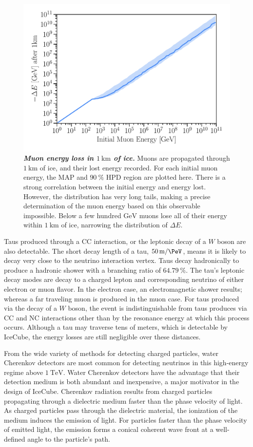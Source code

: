 \begin{figure}
	\centering
	\includegraphics[width=0.8\linewidth]{figures/muon_energy}
	\caption{\textbf{\textit{Muon energy loss in $\SI{1}\km$ of ice.}}
		Muons are propagated through $\SI{1}\km$ of ice, and their lost energy recorded.
		For each initial muon energy, the MAP and $\SI{90}\percent$ HPD region are plotted here.
		There is a strong correlation between the initial energy and energy lost.
		However, the distribution has very long tails, making a precise determination of the muon energy based on this observable impossible.
		Below a few hundred $\si\GeV$ muons lose all of their energy within $\SI{1}\km$ of ice, narrowing the distribution of $\Delta E$.
	}\label{fig:muon_energy}
\end{figure}

Taus produced through a CC interaction, or the leptonic decay of a $W$ boson are also detectable.
The short decay length of a tau, $\SI{50}\meter / \si\PeV$, means it is likely to decay very close to the neutrino interaction vertex.
Taus decay hadronically to produce a hadronic shower with a branching ratio of $\SI{64.79}\percent$.
The tau's leptonic decay modes are decay to a charged lepton and corresponding neutrino of either electron or muon flavor.
In the electron case, an electromagnetic shower results; whereas a far traveling muon is produced in the muon case.
For taus produced via the decay of a $W$ boson, the event is indistinguishable from taus produces via CC and NC interactions other than by the resonance energy at which this process occurs.
Although a tau may traverse tens of meters, which is detectable by IceCube, the energy losses are still negligible over these distances.

From the wide variety of methods for detecting charged particles, water Cherenkov detectors are most common for detecting neutrinos in this high-energy regime above $\SI{1}\TeV$.
Water Cherenkov detectors have the advantage that their detection medium is both abundant and inexpensive, a major motivator in the design of IceCube.
Cherenkov radiation results from charged particles propagating through a dielectric medium faster than the phase velocity of light.
As charged particles pass through the dielectric material, the ionization of the medium induces the emission of light.
For particles faster than the phase velocity of emitted light, the emission forms a conical coherent wave front at a well-defined angle to the particle's path.

